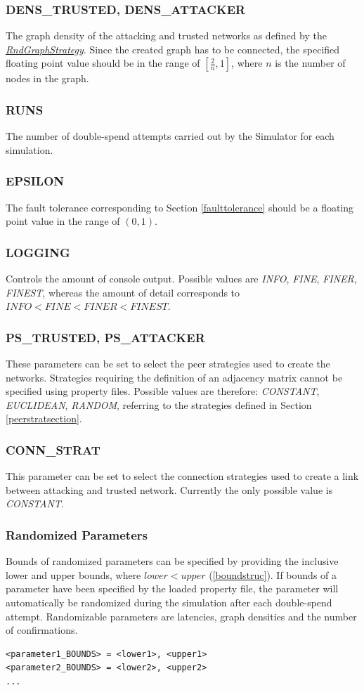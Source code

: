 \documentclass[a4paper,12pt,twoside]{report}
\begin{document}
\subsubsection{DENS\_TRUSTED, DENS\_ATTACKER}
The graph density of the attacking and trusted networks as defined by the \hyperref[rndgraphstrategy]{\textit{RndGraphStrategy}}. Since the created graph has to be connected, the specified floating point value should be in the range of $[\frac{2}{n}, 1]$, where $n$ is the number of nodes in the graph.
\subsubsection{RUNS}
The number of double-spend attempts carried out by the Simulator for each simulation.
\subsubsection{EPSILON}
The fault tolerance corresponding to Section \ref{faulttolerance} should be a floating point value in the range of $(0, 1)$.
\subsubsection{LOGGING}
Controls the amount of console output. Possible values are \textit{INFO}, \textit{FINE}, \textit{FINER}, \textit{FINEST}, whereas the amount of detail corresponds to $\textit{INFO} < \textit{FINE} < \textit{FINER} < \textit{FINEST}$.
\subsubsection{PS\_TRUSTED, PS\_ATTACKER}
These parameters can be set to select the peer strategies used to create the networks. Strategies requiring the definition of an adjacency matrix cannot be specified using property files. Possible values are therefore: \textit{CONSTANT}, \textit{EUCLIDEAN}, \textit{RANDOM}, referring to the strategies defined in Section \ref{peerstratsection}.
\subsubsection{CONN\_STRAT}
This parameter can be set to select the connection strategies used to create a link between attacking and trusted network. Currently the only possible value is \textit{CONSTANT}.
\subsubsection{Randomized Parameters}
Bounds of randomized parameters can be specified by providing the inclusive lower and upper bounds, where $lower < upper$ (\autoref{boundstruc}). If bounds of a parameter have been specified by the loaded property file, the parameter will automatically be randomized during the simulation after each double-spend attempt. Randomizable parameters are latencies, graph densities and the number of confirmations.
\begin{lstlisting}[caption=Defining bounds of randomized parameters,label=boundstruc]
<parameter1_BOUNDS> = <lower1>, <upper1>
<parameter2_BOUNDS> = <lower2>, <upper2>
...
\end{lstlisting}
\end{document}

